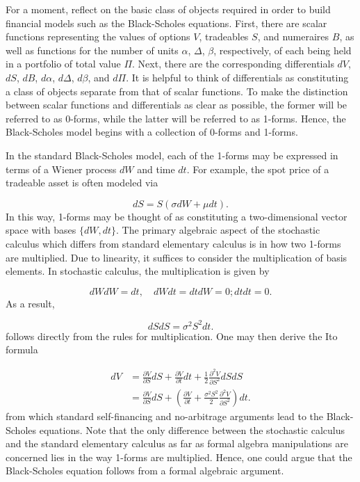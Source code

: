 \documentclass[preprint, 5p, 10pt]{elsarticle}
\theoremstyle{plain}
\begin{document}
For a moment, reflect on the basic class of objects required in order to build financial models such as the Black-Scholes equations. First, there are scalar functions representing the values of options $V$, tradeables $S$, and numeraires $B$, as well as functions for the number of units $\alpha$, $\Delta$, $\beta$, respectively, of each being held in a portfolio of total value $\Pi$. Next, there are the corresponding differentials $d V$, $d S$, $d B$, $d\alpha$, $d \Delta$, $d \beta$, and $d \Pi$. It is helpful to think of differentials as constituting a class of objects separate from that of scalar functions. To make the distinction between scalar functions and differentials as clear as possible, the former will be referred to as 0-forms, while the latter will be referred to as 1-forms. Hence, the Black-Scholes model begins with a collection of 0-forms and 1-forms.

In the standard Black-Scholes model, each of the 1-forms may be expressed in terms of a Wiener process $d W$ and time $d t$. 
For example, the spot price of a tradeable asset is often modeled via

\begin{displaymath}
d S = S(\sigma d W + \mu d t).
\end{displaymath}
In this way, 1-forms may be thought of as constituting a two-dimensional vector space with bases $\{d W, d t\}$. 
The primary algebraic aspect of the stochastic calculus which differs from standard elementary calculus is in how two 1-forms are 
multiplied. Due to linearity, it suffices to consider the multiplication of basis elements. In stochastic calculus, the multiplication 
is given by

\begin{displaymath}
d W d W = dt,\quad d W d t = d t d W = 0; d t d t = 0.
\end{displaymath}
As a result,

\begin{displaymath}
d S d S = \sigma^2 S^2 d t.
\end{displaymath}
follows directly from the rules for multiplication. One may then derive the Ito formula

\begin{displaymath}
\begin{aligned}
d V 
&= \frac{\partial V}{\partial S} d S + \frac{\partial V}{\partial t} d t + \frac{1}{2} \frac{\partial^2 V}{\partial S^2} dS dS \\
&= \frac{\partial V}{\partial S} d S + \left(\frac{\partial V}{\partial t} + \frac{\sigma^2 S^2}{2} \frac{\partial^2 V}{\partial S^2}\right) d t.\end{aligned}
\end{displaymath}
from which standard self-financing and no-arbitrage arguments lead to the Black-Scholes equations. Note that the only difference between the stochastic calculus and the standard elementary calculus as far as formal algebra manipulations are concerned lies in the way 1-forms are multiplied. Hence, one could argue that the Black-Scholes equation follows from a formal algebraic argument.
\end{document}
